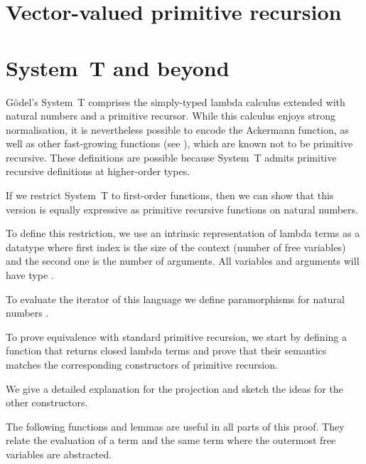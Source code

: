 \documentclass{jfp}
\begin{document}
\section{Vector-valued primitive recursion}
\label{sec:vect-valu-prim}

\section{System~T and beyond}
\label{sec:system-t-beyond}

Gödel's System~T comprises the simply-typed lambda calculus extended
with natural numbers and a primitive recursor. While this calculus
enjoys strong normalisation, it is nevertheless possible to encode the
Ackermann function, as well as other fast-growing functions (see
\cite{DBLP:books/cu/Ha2016,DBLP:journals/corr/Widemann16}), which are known not 
to be primitive recursive. These definitions are possible because
System~T admits primitive recursive definitions at higher-order types.

If we restrict System~T to first-order functions, then we can show
that this version is equally expressive as primitive recursive
functions on natural numbers. 

To define this restriction, we use an intrinsic representation of
lambda terms as a datatype  where first index is the size
of the context (number of free variables) and the second one is the
number of arguments. All variables and arguments will have type \ANat.


To evaluate the iterator of this language we define paramorphisms for
natural numbers \cite{DBLP:conf/fpca/MeijerFP91}. 


\para
\evalST


To prove equivalence with standard primitive recursion, we start by defining a
function that returns closed lambda terms and prove that their
semantics matches the corresponding constructors of primitive recursion.


\prToStSig
\embedPRSTSoundSig


We give a detailed explanation for the projection and sketch the ideas for the other constructors.

The following functions and lemmas are useful in all parts of this
proof. They relate the evaluation of a term and the same term where
the outermost free variables are abstracted.

\prepLambdas
\end{document}
